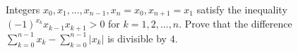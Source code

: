 Integers $x_0,x_1,...,x_{n-1}, x_n = x_0, x_{n+1} = x_1$ satisfy the inequality $(-1)^{x_k} x_{k-1}x_{k+1} >0$ for $k = 1,2,...,n$. Prove that the difference $\sum_{k=0}^{n-1}x_k -\sum_{k=0}^{n-1}|x_k|$ is divisible by $4$.